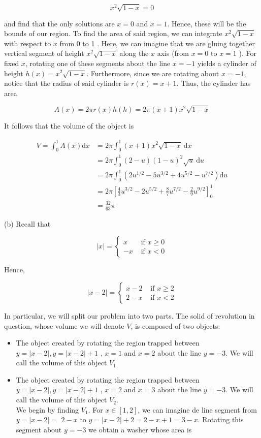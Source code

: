 \documentclass[10pt]{article}
\begin{document}
$$
x^{2} \sqrt{1-x}=0
$$

and find that the only solutions are $x=0$ and $x=1$. Hence, these will be the bounds of our region. To find the area of said region, we can integrate $x^{2} \sqrt{1-x}$ with respect to $x$ from 0 to 1 . Here, we can imagine that we are gluing together vertical segment of height $x^{2} \sqrt{1-x}$ along the $x$ axis (from $x=0$ to $x=1$ ). For fixed $x$, rotating one of these segments about the line $x=-1$ yields a cylinder of height $h(x)=x^{2} \sqrt{1-x}$. Furthermore, since we are rotating about $x=-1$, notice that the radius of said cylinder is $r(x)=x+1$. Thus, the cylinder has area

$$
A(x)=2 \pi r(x) h(h)=2 \pi(x+1) x^{2} \sqrt{1-x}
$$

It follows that the volume of the object is

$$
\begin{aligned}
V=\int_{0}^{1} A(x) \mathrm{d} x & =2 \pi \int_{0}^{1}(x+1) x^{2} \sqrt{1-x} \mathrm{~d} x \\
& =2 \pi \int_{0}^{1}(2-u)(1-u)^{2} \sqrt{u} \mathrm{~d} u \\
& =2 \pi \int_{0}^{1}\left(2 u^{1 / 2}-5 u^{3 / 2}+4 u^{5 / 2}-u^{7 / 2}\right) \mathrm{d} u \\
& =2 \pi\left[\frac{4}{3} u^{3 / 2}-2 u^{5 / 2}+\frac{8}{7} u^{7 / 2}-\frac{2}{9} u^{9 / 2}\right]_{0}^{1} \\
& =\frac{32}{63} \pi
\end{aligned}
$$

(b) Recall that

$$
|x|= \begin{cases}x & \text { if } x \geq 0 \\ -x & \text { if } x<0\end{cases}
$$

Hence,

$$
|x-2|= \begin{cases}x-2 & \text { if } x \geq 2 \\ 2-x & \text { if } x<2\end{cases}
$$

In particular, we will split our problem into two parts. The solid of revolution in question, whose volume we will denote $V$, is composed of two objects:

\begin{itemize}
  \item The object created by rotating the region trapped between $y=|x-2|, y=|x-2|+1$ , $x=1$ and $x=2$ about the line $y=-3$. We will call the volume of this object $V_{1}$
  \item The object created by rotating the region trapped between $y=|x-2|, y=|x-2|+1$ , $x=2$ and $x=3$ about the line $y=-3$. We will call the volume of this object $V_{2}$.\\
We begin by finding $V_{1}$. For $x \in[1,2]$, we can imagine de line segment from $y=|x-2|=$ $2-x$ to $y=|x-2|+2=2-x+1=3-x$. Rotating this segment about $y=-3$ we obtain a washer whose area is
\end{itemize}
\end{document}

